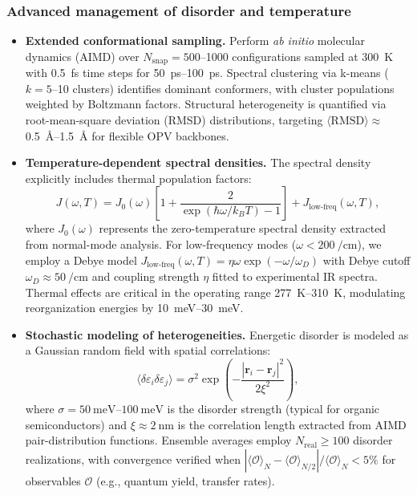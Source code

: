 \documentclass[12pt, a4paper]{article}
\begin{document}
\subsubsection{Advanced management of disorder and temperature}

\begin{itemize}
    \item \textbf{Extended conformational sampling.} Perform \textit{ab initio} molecular dynamics (AIMD) over $N_{\text{snap}} = 500$--\num{1000} configurations sampled at \SI{300}{\kelvin} with \SI{0.5}{\femto\second} time steps for \SIrange{50}{100}{\pico\second}. Spectral clustering via k-means ($k=5$--10 clusters) identifies dominant conformers, with cluster populations weighted by Boltzmann factors. Structural heterogeneity is quantified via root-mean-square deviation (RMSD) distributions, targeting $\langle \text{RMSD} \rangle \approx$ \SIrange{0.5}{1.5}{\angstrom} for flexible OPV backbones.
    
    \item \textbf{Temperature-dependent spectral densities.}
    The spectral density explicitly includes thermal population factors:
    \begin{equation}
    \label{eq:spectral_density}
    J(\omega, T) = J_0(\omega)\left[1 + \frac{2}{\exp(\hbar\omega/k_B T) - 1}\right] + J_{\text{low-freq}}(\omega, T),
    \end{equation}
    where $J_0(\omega)$ represents the zero-temperature spectral density extracted from normal-mode analysis. For low-frequency modes ($\omega < \SI{200}{\per\centi\meter}$), we employ a Debye model $J_{\text{low-freq}}(\omega, T) = \eta \omega \exp(-\omega/\omega_D)$ with Debye cutoff $\omega_D \approx \SI{50}{\per\centi\meter}$ and coupling strength $\eta$ fitted to experimental IR spectra. Thermal effects are critical in the operating range \SIrange{277}{310}{\kelvin}, modulating reorganization energies by \SIrange{10}{30}{\milli\electronvolt}.
    
    \item \textbf{Stochastic modeling of heterogeneities.} Energetic disorder is modeled as a Gaussian random field with spatial correlations:
    \begin{equation}
    \langle \delta \varepsilon_i \delta \varepsilon_j \rangle = \sigma^2 \exp\left(-\frac{|\mathbf{r}_i - \mathbf{r}_j|^2}{2\xi^2}\right),
    \end{equation}
    where $\sigma = \SIrange{50}{100}{\milli\electronvolt}$ is the disorder strength (typical for organic semiconductors) and $\xi \approx \SI{2}{\nano\meter}$ is the correlation length extracted from AIMD pair-distribution functions. Ensemble averages employ $N_{\text{real}} \geq 100$ disorder realizations, with convergence verified when $|\langle \mathcal{O} \rangle_{N} - \langle \mathcal{O} \rangle_{N/2}| / \langle \mathcal{O} \rangle_{N} < 5\%$ for observables $\mathcal{O}$ (e.g., quantum yield, transfer rates).
\end{itemize}
\end{document}

